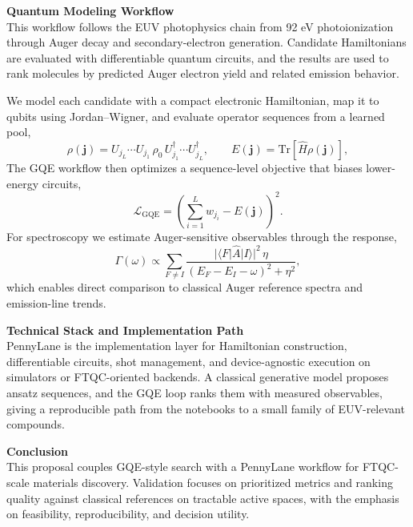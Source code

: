 \documentclass[11pt]{article}
\begin{document}
\noindent\textbf{Quantum Modeling Workflow}\\
This workflow follows the EUV photophysics chain from 92 eV photoionization through Auger decay and secondary-electron generation. Candidate Hamiltonians are evaluated with differentiable quantum circuits, and the results are used to rank molecules by predicted Auger electron yield and related emission behavior.

We model each candidate with a compact electronic Hamiltonian, map it to qubits using Jordan--Wigner, and evaluate operator sequences from a learned pool,
\begin{equation*}
\rho(\mathbf{j}) = U_{j_L}\cdots U_{j_1}\,\rho_0\,U_{j_1}^{\dagger}\cdots U_{j_L}^{\dagger},
\qquad
E(\mathbf{j}) = \mathrm{Tr}\!\left[\hat{H}\rho(\mathbf{j})\right],
\end{equation*}
The GQE workflow then optimizes a sequence-level objective that biases lower-energy circuits,
\begin{equation*}
\mathcal{L}_{\mathrm{GQE}} = \left(\sum_{i=1}^{L} w_{j_i} - E(\mathbf{j})\right)^2.
\end{equation*}
For spectroscopy we estimate Auger-sensitive observables through the response,
\begin{equation*}
\Gamma(\omega) \propto \sum_{F\neq I}\frac{|\langle F|\hat{A}|I\rangle|^2\,\eta}{(E_F-E_I-\omega)^2+\eta^2},
\end{equation*}
which enables direct comparison to classical Auger reference spectra and emission-line trends.

\noindent\textbf{Technical Stack and Implementation Path}\\
PennyLane is the implementation layer for Hamiltonian construction, differentiable circuits, shot management, and device-agnostic execution on simulators or FTQC-oriented backends. A classical generative model proposes ansatz sequences, and the GQE loop ranks them with measured observables, giving a reproducible path from the notebooks to a small family of EUV-relevant compounds.

\noindent\textbf{Conclusion}\\
This proposal couples GQE-style search with a PennyLane workflow for FTQC-scale materials discovery. Validation focuses on prioritized metrics and ranking quality against classical references on tractable active spaces, with the emphasis on feasibility, reproducibility, and decision utility.
\end{document}
